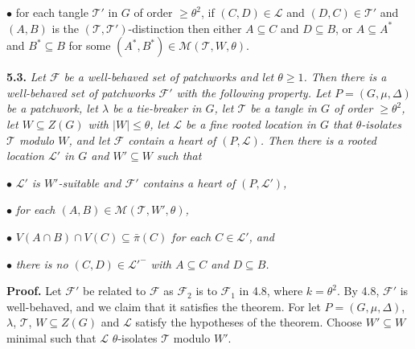 \hspace*{12pt}$\bullet$ for each tangle $\mathcal{T}'$ in $G$ of order $\ge \theta^2$, if $(C, D) \in \mathcal{L}$ and $(D, C) \in \mathcal{T}'$ and $(A, B)$ is the $(\mathcal{T}, \mathcal{T}')$-distinction then either $A \subseteq C$ and $D \subseteq B$, or $A \subseteq A^*$ and $B^* \subseteq B$ for some $(A^*, B^*) \in \mathcal{M}(\mathcal{T}, W, \theta)$.

\textbf{5.3.} \textit{Let $\mathcal{F}$ be a well-behaved set of patchworks and let $\theta \ge 1$. Then there is a well-behaved set of patchworks $\mathcal{F}'$ with the following property. Let $P = (G, \mu, \Delta)$ be a patchwork, let $\lambda$ be a tie-breaker in $G$, let $\mathcal{T}$ be a tangle in $G$ of order $\ge \theta^2$, let $W \subseteq Z(G)$ with $|W| \le \theta$, let $\mathcal{L}$ be a fine rooted location in $G$ that $\theta$-isolates $\mathcal{T}$ modulo $W$, and let $\mathcal{F}$ contain a heart of $(P, \mathcal{L})$. Then there is a rooted location $\mathcal{L}'$ in $G$ and $W' \subseteq W$ such that}

\hspace*{12pt}$\bullet$ \textit{$\mathcal{L}'$ is $W'$-suitable and $\mathcal{F}'$ contains a heart of $(P, \mathcal{L}')$,}

\hspace*{12pt}$\bullet$ \textit{for each $(A, B) \in \mathcal{M}(\mathcal{T}, W', \theta)$,}

\hspace*{12pt}$\bullet$ \textit{$V(A \cap B) \cap V(C) \subseteq \bar{\pi}(C)$ for each $C \in \mathcal{L}'$, and}

\hspace*{12pt}$\bullet$ \textit{there is no $(C, D) \in \mathcal{L}'^-$ with $A \subseteq C$ and $D \subseteq B$.}

\textbf{Proof.} Let $\mathcal{F}'$ be related to $\mathcal{F}$ as $\mathcal{F}_2$ is to $\mathcal{F}_1$ in 4.8, where $k = \theta^2$. By 4.8, $\mathcal{F}'$ is well-behaved, and we claim that it satisfies the theorem. For let $P = (G, \mu, \Delta)$, $\lambda$, $\mathcal{T}$, $W \subseteq Z(G)$ and $\mathcal{L}$ satisfy the hypotheses of the theorem. Choose $W' \subseteq W$ minimal such that $\mathcal{L}$ $\theta$-isolates $\mathcal{T}$ modulo $W'$.

